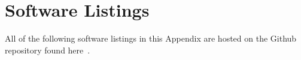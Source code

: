 \sloppy
{}
\setlength{\parindent}{0pt}

\section{Software Listings}

All of the following software listings in this Appendix are hosted on the Github repository found here~\cite{Russo2016c}. 

%
%
%
%
%
%
%
%
%
%
%
%
%
%
%
%

